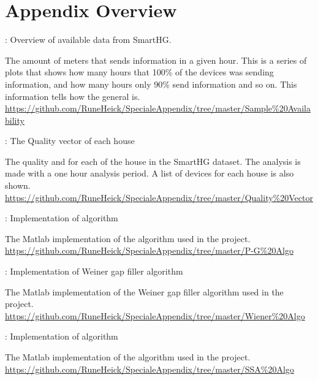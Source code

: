 \chapter*{Appendix Overview}
\label{sec:Appendix}

 : Overview of available data from SmartHG. 
\begin{addmargin}[2.5em]{0.0em}
The amount of meters that sends information in a given hour. This is a series of plots that shows how many hours that 100\% of the devices was sending information, and how many hours only 90\% send information and so on. This information tells how the general  is.\\
\url{https://github.com/RuneHeick/SpecialeAppendix/tree/master/Sample\%20Availability}
\end{addmargin}

 : The Quality vector of each house
\begin{adjustwidth}{2.5em}{0.0em}
The quality and  for each of the house in the SmartHG dataset. The analysis is made with a one hour analysis period. A list of devices for each house is also shown.\\
\url{https://github.com/RuneHeick/SpecialeAppendix/tree/master/Quality\%20Vector}
\end{adjustwidth}

 : Implementation of  algorithm
\begin{adjustwidth}{2.5em}{0.0em}
The Matlab implementation of the  algorithm used in the project. \\
\url{https://github.com/RuneHeick/SpecialeAppendix/tree/master/P-G\%20Algo}
\end{adjustwidth}

 : Implementation of Weiner gap filler algorithm
\begin{addmargin}[2.5em]{0.0em}
The Matlab implementation of the Weiner gap filler algorithm used in the project.\\
\url{https://github.com/RuneHeick/SpecialeAppendix/tree/master/Wiener\%20Algo}
\end{addmargin}

 : Implementation of  algorithm
\begin{adjustwidth}{2.5em}{0.0em}
The Matlab implementation of the  algorithm used in the project. \\
\url{https://github.com/RuneHeick/SpecialeAppendix/tree/master/SSA\%20Algo}
\end{adjustwidth}

